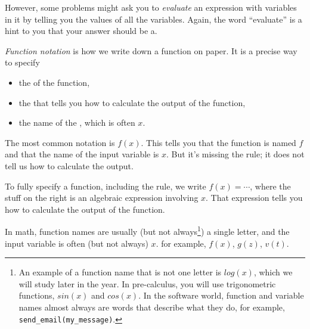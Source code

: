 \documentclass[fleqn,letterpaper,12pt,printwatermark=false]{memoir}
\begin{document}
However, some problems might ask you to \emph{evaluate} an expression
with variables in it 
by telling you the values of all the variables.
Again, the word ``evaluate'' is a hint to you that your answer should be a.




\begin{myLesson}[][]
    \emph{Function notation}
    is how we write down a function on paper.
    It is a precise way to specify
    \begin{itemize}
        \item the  of the function,
        \item the  that tells you how to calculate the output of the function,
        \item the name of the , which is often $x$.
    \end{itemize}

    \begin{myLessonBox}
    The most common notation is $f(x)$.
    This tells you that the function is named $f$ 
    and that the name of the input variable is $x$.
    But it's missing the rule; 
    it does not tell us how to calculate the output.

    To fully specify a function, including the rule, we write $f(x) = \cdots$,
    where the stuff on the right is an algebraic expression involving $x$.
    That expression tells you how to calculate the output of the function.
    \end{myLessonBox}

    In math,
    function names are usually (but not always\footnote{
        An example of a function name that is not one letter 
        is $log(x)$, which we will study later in the year.
        In pre-calculus, you will use trigonometric functions,
        $sin(x)$ and $cos(x)$.
        In the software world, function and variable names almost always 
        are words that describe what they do, for example,
        \texttt{send\_email(my\_message)}.
    }) a single letter,
    and the input variable is often (but not always) $x$.
    for example, $f(x)$, $g(z)$, $v(t)$.

\end{myLesson}
\end{document}
